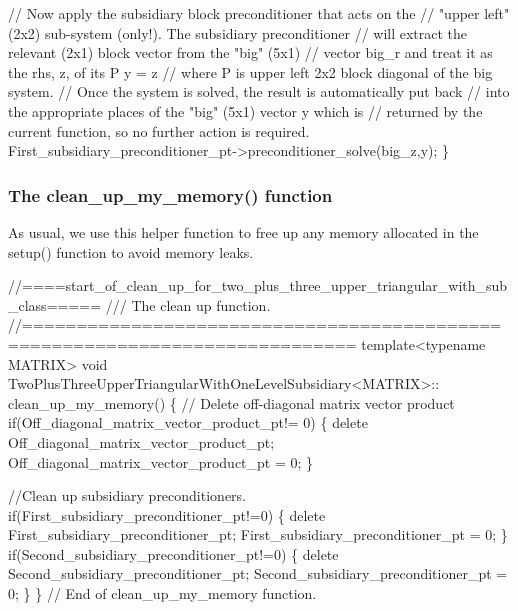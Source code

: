 \begin{DoxyCodeInclude}
  \textcolor{comment}{// Now apply the subsidiary block preconditioner that acts on the}
  \textcolor{comment}{// "upper left" (2x2) sub-system (only!). The subsidiary preconditioner }
  \textcolor{comment}{// will extract the relevant (2x1) block vector from the "big" (5x1)}
  \textcolor{comment}{// vector big\_r and treat it as the rhs, z, of its P y = z}
  \textcolor{comment}{// where P is upper left 2x2 block diagonal of the big system. }
  \textcolor{comment}{// Once the system is solved, the result is automatically put back }
  \textcolor{comment}{// into the appropriate places of the "big" (5x1) vector y which is }
  \textcolor{comment}{// returned by the current function, so no further action is required.}
  First\_subsidiary\_preconditioner\_pt->preconditioner\_solve(big\_z,y);
 \}

\end{DoxyCodeInclude}
\hypertarget{index_two_plus_three_upper_triangular_with_sub_clean}{}\subsubsection{The clean\+\_\+up\+\_\+my\+\_\+memory() function}\label{index_two_plus_three_upper_triangular_with_sub_clean}
As usual, we use this helper function to free up any memory allocated in the {\ttfamily setup()} function to avoid memory leaks.


\begin{DoxyCodeInclude}
 \textcolor{comment}{//====start\_of\_clean\_up\_for\_two\_plus\_three\_upper\_triangular\_with\_sub\_class=====}\textcolor{comment}{}
\textcolor{comment}{ /// The clean up function.}
\textcolor{comment}{} \textcolor{comment}{//============================================================================}
 \textcolor{keyword}{template}<\textcolor{keyword}{typename} MATRIX> 
 \textcolor{keywordtype}{void} TwoPlusThreeUpperTriangularWithOneLevelSubsidiary<MATRIX>::
 clean\_up\_my\_memory()
 \{     
  \textcolor{comment}{// Delete off-diagonal matrix vector product}
  \textcolor{keywordflow}{if}(Off\_diagonal\_matrix\_vector\_product\_pt!= 0)
   \{
    \textcolor{keyword}{delete} Off\_diagonal\_matrix\_vector\_product\_pt;
    Off\_diagonal\_matrix\_vector\_product\_pt = 0;
   \}

  \textcolor{comment}{//Clean up subsidiary preconditioners.}
  \textcolor{keywordflow}{if}(First\_subsidiary\_preconditioner\_pt!=0)
   \{
    \textcolor{keyword}{delete} First\_subsidiary\_preconditioner\_pt;
    First\_subsidiary\_preconditioner\_pt = 0;
   \}
  \textcolor{keywordflow}{if}(Second\_subsidiary\_preconditioner\_pt!=0)
   \{
    \textcolor{keyword}{delete} Second\_subsidiary\_preconditioner\_pt;
    Second\_subsidiary\_preconditioner\_pt = 0;
   \}
 \} \textcolor{comment}{// End of clean\_up\_my\_memory function.}

\end{DoxyCodeInclude}




